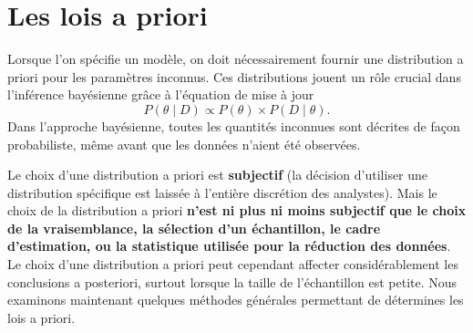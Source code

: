 \section{Les lois a priori}
Lorsque l’on spécifie un modèle, on doit nécessairement fournir une distribution a priori pour les paramètres inconnus. Ces distributions jouent un rôle crucial dans l'inférence bayésienne grâce à l’équation de mise à jour
$$P(\theta\mid D) \propto P(\theta) \times P(D\mid \theta).$$ Dans l'approche bayésienne, toutes les quantités inconnues sont décrites de façon probabiliste, même avant que les données n'aient été observées.  \par Le choix d’une distribution a priori est \textbf{subjectif} (la décision d'utiliser une distribution spécifique est laissée à l'entière discrétion des analystes). Mais le choix de la distribution a priori \textbf{n'est ni plus ni moins subjectif que le choix de la vraisemblance, la sélection d'un échantillon, le cadre d’estimation, ou la statistique utilisée pour la réduction des données}.  \newl Le choix d'une distribution a priori peut cependant affecter considérablement les conclusions a posteriori, surtout lorsque la taille de l'échantillon est petite. \newl
Nous examinons maintenant quelques méthodes générales permettant de détermines les lois a priori.
